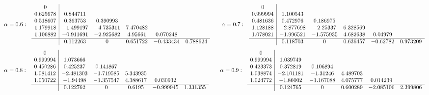 \[
\alpha=0.6:\ \ \begin{array}{c|ccccc}
0 &  &  &  &  &  \\
0.625678 & 0.844711 &  &  &  &  \\
0.518607 & 0.363753 & 0.390993 &  &  &  \\
1.179918 & -1.499197 & -4.735311 & 7.470482 &  &  \\
1.106882 & -0.911691 & -2.925682 & 4.95661 & 0.070248 &  \\
\hline
 & 0.112263 & 0 & 0.651722 & -0.433434 & 0.788624
\end{array}\qquad \alpha=0.7:\ \ \begin{array}{c|ccccc}
0 &  &  &  &  &  \\
0.999994 & 1.100543 &  &  &  &  \\
0.481636 & 0.472976 & 0.186975 &  &  &  \\
1.128188 & -2.877698 & -2.25337 & 6.328569 &  &  \\
1.078021 & -1.996521 & -1.575935 & 4.682638 & 0.04979 &  \\
\hline
 & 0.118703 & 0 & 0.636457 & -0.62782 & 0.973209
\end{array}
\]
\[
\alpha=0.8:\ \ \begin{array}{c|ccccc}
0 &  &  &  &  &  \\
0.999994 & 1.073666 &  &  &  &  \\
0.450286 & 0.425237 & 0.141867 &  &  &  \\
1.081412 & -2.481303 & -1.719585 & 5.343935 &  &  \\
1.050722 & -1.94498 & -1.357547 & 4.388617 & 0.030932 &  \\
\hline
 & 0.122762 & 0 & 0.6195 & -0.999945 & 1.331355
\end{array}\qquad \alpha=0.9:\ \ \begin{array}{c|ccccc}
0 &  &  &  &  &  \\
0.999994 & 1.039749 &  &  &  &  \\
0.423373 & 0.372819 & 0.106894 &  &  &  \\
1.038874 & -2.101181 & -1.31246 & 4.489703 &  &  \\
1.024772 & -1.86002 & -1.167088 & 4.075777 & 0.014239 &  \\
\hline
 & 0.124765 & 0 & 0.600289 & -2.085106 & 2.399806
\end{array}
\]
